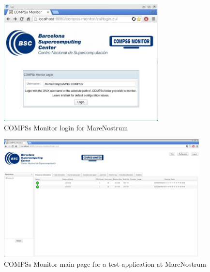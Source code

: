 \begin{figure}[ht!]
  \centering
    \includegraphics[width=0.75\textwidth]{./Sections/4_Monitor/Figures/mn_monitor1.jpeg}
    \caption{COMPSs Monitor login for MareNostrum}
    \label{fig:mn_monitor1}
\end{figure}

\begin{figure}[ht!]
  \centering
    \includegraphics[width=0.95\textwidth]{./Sections/4_Monitor/Figures/mn_monitor2.jpeg}
    \caption{COMPSs Monitor main page for a test application at MareNostrum}
    \label{fig:mn_monitor2}
\end{figure}


